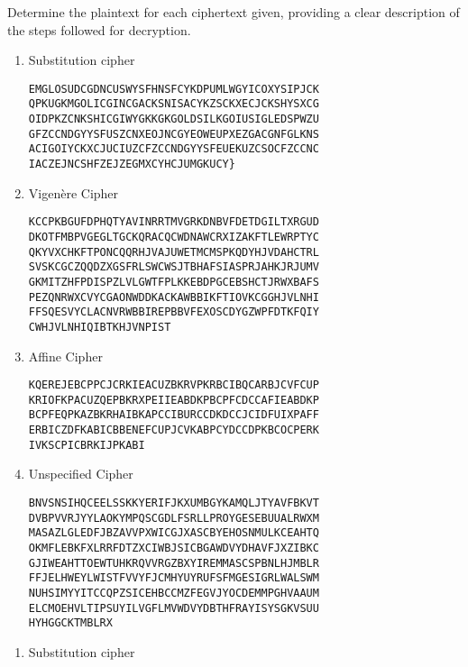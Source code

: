 \begin{statement}{1.21}
  Determine the plaintext for each ciphertext given, providing a clear description of
  the steps followed for decryption.

  \begin{enumerate}[label=(\alph*)]
    \item Substitution cipher

\begin{verbatim}
EMGLOSUDCGDNCUSWYSFHNSFCYKDPUMLWGYICOXYSIPJCK
QPKUGKMGOLICGINCGACKSNISACYKZSCKXECJCKSHYSXCG
OIDPKZCNKSHICGIWYGKKGKGOLDSILKGOIUSIGLEDSPWZU
GFZCCNDGYYSFUSZCNXEOJNCGYEOWEUPXEZGACGNFGLKNS
ACIGOIYCKXCJUCIUZCFZCCNDGYYSFEUEKUZCSOCFZCCNC
IACZEJNCSHFZEJZEGMXCYHCJUMGKUCY}
\end{verbatim}
              
  \item Vigen\`{e}re Cipher

\begin{verbatim}
KCCPKBGUFDPHQTYAVINRRTMVGRKDNBVFDETDGILTXRGUD
DKOTFMBPVGEGLTGCKQRACQCWDNAWCRXIZAKFTLEWRPTYC
QKYVXCHKFTPONCQQRHJVAJUWETMCMSPKQDYHJVDAHCTRL
SVSKCGCZQQDZXGSFRLSWCWSJTBHAFSIASPRJAHKJRJUMV
GKMITZHFPDISPZLVLGWTFPLKKEBDPGCEBSHCTJRWXBAFS
PEZQNRWXCVYCGAONWDDKACKAWBBIKFTIOVKCGGHJVLNHI
FFSQESVYCLACNVRWBBIREPBBVFEXOSCDYGZWPFDTKFQIY
CWHJVLNHIQIBTKHJVNPIST
\end{verbatim}

\item  Affine Cipher

\begin{verbatim}
KQEREJEBCPPCJCRKIEACUZBKRVPKRBCIBQCARBJCVFCUP
KRIOFKPACUZQEPBKRXPEIIEABDKPBCPFCDCCAFIEABDKP
BCPFEQPKAZBKRHAIBKAPCCIBURCCDKDCCJCIDFUIXPAFF
ERBICZDFKABICBBENEFCUPJCVKABPCYDCCDPKBCOCPERK
IVKSCPICBRKIJPKABI
\end{verbatim}

\item Unspecified Cipher

\begin{verbatim}
BNVSNSIHQCEELSSKKYERIFJKXUMBGYKAMQLJTYAVFBKVT
DVBPVVRJYYLAOKYMPQSCGDLFSRLLPROYGESEBUUALRWXM
MASAZLGLEDFJBZAVVPXWICGJXASCBYEHOSNMULKCEAHTQ
OKMFLEBKFXLRRFDTZXCIWBJSICBGAWDVYDHAVFJXZIBKC
GJIWEAHTTOEWTUHKRQVVRGZBXYIREMMASCSPBNLHJMBLR
FFJELHWEYLWISTFVVYFJCMHYUYRUFSFMGESIGRLWALSWM
NUHSIMYYITCCQPZSICEHBCCMZFEGVJYOCDEMMPGHVAAUM
ELCMOEHVLTIPSUYILVGFLMVWDVYDBTHFRAYISYSGKVSUU
HYHGGCKTMBLRX
\end{verbatim}
\end{enumerate}
\end{statement}

  \begin{enumerate}[label=(\alph*)]
    \item Substitution cipher
      
  \end{enumerate}
